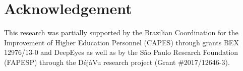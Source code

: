 \documentclass[journal,twocolumn]{IEEEtran}
\begin{document}






\section{Acknowledgement}
\label{sec:ack}
This research was partially supported by the Brazilian Coordination for the Improvement of Higher Education Personnel (CAPES) through grants BEX 12976/13-0 and DeepEyes as well as by the S\~{a}o Paulo Research Foundation (FAPESP) through the D\'{e}j\`{a}Vu  research project (Grant \#2017/12646-3).





\end{document}
